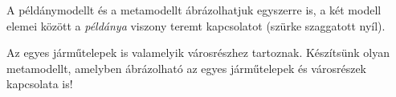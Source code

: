 A példánymodellt és a metamodellt ábrázolhatjuk egyszerre is, a két modell elemei között a \emph{példánya} viszony teremt kapcsolatot (szürke szaggatott nyíl).



\begin{feladat}
	Az egyes járműtelepek is valamelyik városrészhez tartoznak. Készítsünk olyan metamodellt, amelyben ábrázolható az egyes járműtelepek és városrészek kapcsolata is!
\end{feladat}










